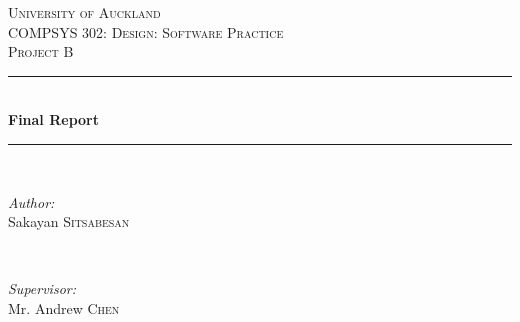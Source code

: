 \documentclass[a4paper,10pt,twoside]{article}
\begin{document}
\begin{titlepage}

\newcommand{\HRule}{\rule{\linewidth}{0.5mm}} %

\center %
 

\textsc{\LARGE University of Auckland}\\[1.5cm] %
\textsc{\Large COMPSYS 302: Design: Software Practice}\\[0.5cm] %
\textsc{\large Project B }\\[0.5cm] %


\HRule \\[0.4cm]
{ \huge \bfseries Final Report}\\[0.4cm] %
\HRule \\[1.5cm]
 

\begin{minipage}{0.4\textwidth}
\begin{flushleft} \large
\emph{Author:}\\
Sakayan \textsc{Sitsabesan}
\end{flushleft}
\end{minipage}
~
\begin{minipage}{0.4\textwidth}
\begin{flushright} \large
\emph{Supervisor:} \\
Mr. Andrew \textsc{Chen} %
\end{flushright}
\end{minipage}\\[1cm]




\end{titlepage}
\end{document}
